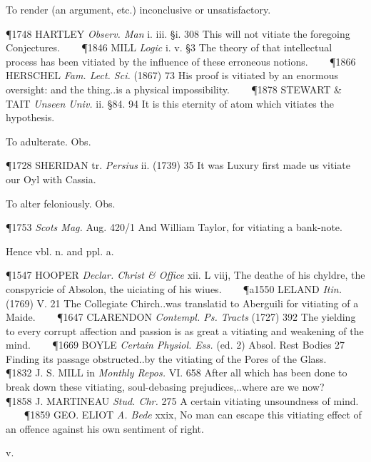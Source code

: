 \begin{description}[wide, labelwidth=!, labelindent=0pt]
\begin{myenumerate}
 To render (an argument, etc.) inconclusive or unsatisfactory.

\P 1748 HARTLEY  \textit{Observ. Man} i. iii. §i. 308 This will not vitiate the foregoing Conjectures.    
\P 1846 MILL  \textit{Logic} i. v. §3 The theory of that intellectual process has been vitiated by the influence of these erroneous notions.    
\P 1866 HERSCHEL  \textit{Fam. Lect. Sci.} (1867) 73 His proof is vitiated by an enormous oversight: and the thing..is a physical impossibility.    
\P 1878 STEWART \& TAIT  \textit{Unseen Univ.} ii. §84. 94 It is this eternity of atom which vitiates the hypothesis.

 To adulterate. Obs.

\P 1728 SHERIDAN tr.  \textit{Persius} ii. (1739) 35 It was Luxury first made us vitiate our Oyl with Cassia.

 To alter feloniously. Obs.

\P 1753  \textit{Scots Mag.} Aug. 420/1 And William Taylor, for vitiating a bank-note.

\noindent Hence \textbf{} vbl. n. and ppl. a.

\P 1547 HOOPER  \textit{Declar. Christ \& Office} xii. L viij, The deathe of his chyldre, the conspyricie of Absolon, the uiciating of his wiues.    
\P a1550 LELAND  \textit{Itin.} (1769) V. 21 The Collegiate Chirch..was translatid to Aberguili for vitiating of a Maide.    
\P 1647 CLARENDON  \textit{Contempl. Ps. Tracts} (1727) 392 The yielding to every corrupt affection and passion is as great a vitiating and weakening of the mind.    
\P 1669 BOYLE  \textit{Certain Physiol. Ess.} (ed. 2) Absol. Rest Bodies 27 Finding its passage obstructed..by the vitiating of the Pores of the Glass.    
\P 1832 J. S. MILL in  \textit{Monthly Repos.} VI. 658 After all which has been done to break down these vitiating, soul-debasing prejudices,..where are we now?    
\P 1858 J. MARTINEAU  \textit{Stud. Chr.} 275 A certain vitiating unsoundness of mind.    
\P 1859 GEO. ELIOT  \textit{A. Bede} xxix, No man can escape this vitiating effect of an offence against his own sentiment of right.
\end{myenumerate}


 v.

\noindent {}



\end{description}
